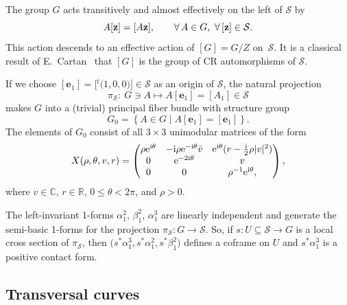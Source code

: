 \documentclass[10pt,a4paper]{amsart}
\numberwithin{equation}{section}
\def\C{\mathbb{C}}
\def\R{\mathbb{R}}
\def\S{\mathcal{S}}
\def\S{\mathcal{S}}
\begin{document}
The group $G$ acts transitively and almost effectively on the left of
$\S$ by
\begin{equation*}
 A[{\bf z}] = [A {\bf z}], \qquad \forall \, A\in {G}, \  \forall \, [{\bf z}] \in\S.
 \end{equation*}
This action descends to an effective action of $[{G}]={ G}/{Z}$ on~$\S$.
It is a classical result of E.~Cartan~\cite{Cartan1932-2,Cartan1932,ChMo1974} that $[{G}]$
is the group of CR automorphisms
of $\S$.

If we choose $[\mathbf{e}_1]=\big[ {^t\!(}1,0,0)\big]\in \mathcal{S}$ as an origin of $\mathcal{S}$,
the natural projection
\begin{equation*}
 \pi_\S\colon \ {G}\ni A \mapsto A[\mathbf{e}_1] =[A_1]\in\S
 \end{equation*}
makes ${G}$ into a (trivial) principal fiber bundle with structure group
\begin{equation*}
 {G}_0=\left\{ A\in {G} \mid A[\mathbf{e}_1]=[\mathbf{e}_1] \right\}.
 \end{equation*}
The elements of ${G}_0$ consist of all $3\times3$ unimodular matrices of the form
\begin{equation}\label{gauge}
{X}(\rho,\theta,v,r)=
\begin{pmatrix}
\rho {\rm e}^{{\rm i}\theta} & -{\rm i}\rho {\rm e}^{-{\rm i}\theta}\bar {v} & {\rm e}^{{\rm i}\theta}(r-\frac{{\rm i}}{2}\rho |v|^2) \\
 0 & {\rm e}^{-2{\rm i}\theta} & v \\
 0 & 0 & \rho^{-1}{\rm e}^{{\rm i}\theta}, \\
 \end{pmatrix},
 \end{equation}
where $v\in \C$, $r \in \R$, $0\leq\theta <2\pi$, and $\rho>0$.

\begin{Remark}
The left-invariant 1-forms $\alpha_1^2$, $\beta_1^2$, $\alpha_1^3$ are linearly independent and generate
the semi-basic 1-forms for the projection $\pi_{\mathcal S}\colon G \to \mathcal S$. So, if $s\colon U\subseteq\S\to{G}$ is
a local cross section of $\pi_\S$,
then $\big(s^*\alpha_1^3 , s^*\alpha_1^2, s^* \beta_1^2 \big)$
defines a coframe on $U$ and $s^*\alpha_1^3 $ is a positive contact form.\end{Remark}

\subsection{Transversal curves}
\end{document}
